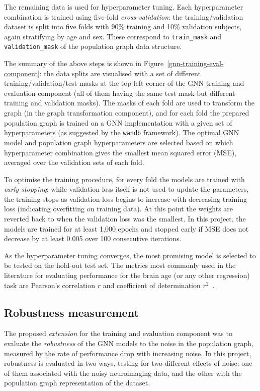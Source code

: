 The remaining data is used for hyperparameter tuning. Each hyperparameter combination is trained using five-fold \textit{cross-validation}: the training/validation dataset is split into five folds with 90\% training and 10\% validation subjects, again stratifying by age and sex. These correspond to \texttt{train\_mask} and \texttt{validation\_mask} of the population graph data structure. 

The summary of the above steps is shown in Figure~\ref{gnn-training-eval-component}: the data splits are visualised with a set of different training/validation/test masks at the top left corner of the GNN training and evaluation component (all of them having the same test mask but different training and validation masks). The masks of each fold are used to transform the graph (in the graph transformation component), and for each fold the prepared population graph is trained on a GNN implementation with a given set of hyperparameters (as suggested by the \texttt{wandb} framework). The optimal GNN model and population graph hyperparameters are selected based on which hyperparameter combination gives the smallest mean squared error (MSE), averaged over the validation sets of each fold.

To optimise the training procedure, for every fold the models are trained with \textit{early stopping}: while validation loss itself is not used to update the parameters, the training stops as validation loss begins to increase with decreasing training loss (indicating overfitting on training data). At this point the weights are reverted back to when the validation loss was the smallest. In this project, the models are trained for at least 1,000 epochs and stopped early if MSE does not decrease by at least 0.005 over 100 consecutive iterations. 

As the hyperparameter tuning converges, the most promising model is selected to be tested on the hold-out test set. The metrics most commonly used in the literature for evaluating performance for the brain age (or any other regression) task are Pearson's correlation $r$ and coefficient of determination $r^2$~\cite{pervaiz2020optimising, niu2019improved}.

\subsection{Robustness measurement}
The proposed \textit{extension} for the training and evaluation component was to evaluate the \textit{robustness} of the GNN models to the noise in the population graph, measured by the rate of performance drop with increasing noise. In this project, robustness is evaluated in two ways, testing for two different effects of noise: one of them associated with the noisy neuroimaging data, and the other with the population graph representation of the dataset.

